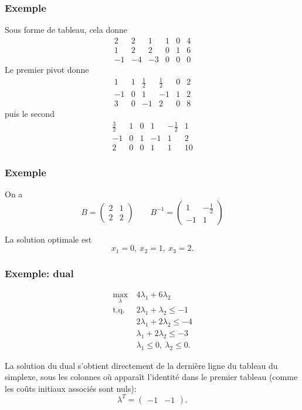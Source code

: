 \documentclass[usepdftitle=false]{beamer}
\begin{document}
\begin{frame}
	\frametitle{Exemple}
	
	Sous forme de tableau, cela donne
	\[
	\begin{matrix}
		2 & 2 & 1 & 1 & 0 & 4 \\
		1 & 2 & 2 & 0 & 1 & 6 \\
		-1 & -4 & -3 & 0 & 0 & 0
	\end{matrix}
	\]
	Le premier pivot donne
	\[
	\begin{matrix}
		1 & 1 & \frac{1}{2} & \frac{1}{2} & 0 & 2 \\
		-1 & 0 & 1 & -1 & 1 & 2 \\
		3 & 0 & -1 & 2 & 0 & 8
	\end{matrix}
	\]
	puis le second
	\[
	\begin{matrix}
		\frac{3}{2} & 1 & 0 & 1 & -\frac{1}{2} & 1 \\
		-1 & 0 & 1 & -1 & 1 & 2 \\
		2 & 0 & 0 & 1 & 1 & 10
	\end{matrix}
	\]
	
\end{frame}

\begin{frame}
	\frametitle{Exemple}
	
	On a
	\[
	B = \begin{pmatrix}
		2 & 1 \\
		2 & 2
	\end{pmatrix}
	\qquad
	B^{-1} = \begin{pmatrix}
		1 & -\frac{1}{2} \\
		-1 & 1
	\end{pmatrix}
	\]
	
	\mbox{}
	
	La solution optimale est
	\[
	x_1 = 0,\ x_2 = 1,\ x_3 = 2.
	\]
	
\end{frame}

\begin{frame}
	\frametitle{Exemple: dual}
	
	\begin{align*}
		\max_{\lambda}\ & 4\lambda_1 + 6\lambda_2 \\
		\mbox{t.q. } & 2\lambda_1 + \lambda_2 \leq -1 \\
		& 2\lambda_1 + 2\lambda_2 \leq -4 \\
		& \lambda_1 + 2\lambda_2 \leq -3 \\
		& \lambda_1 \leq 0, \ \lambda_2 \leq 0.
	\end{align*}
	
	\mbox{}
	
	La solution du dual s'obtient directement de la dernière ligne du tableau du simplexe, sous les colonnes où apparaît l'identité dans le premier tableau (comme les coûts initiaux associés sont nuls):
	\[
	\lambda^T = \begin{pmatrix} -1 & -1 \end{pmatrix}.
	\]
	
\end{frame}
\end{document}
